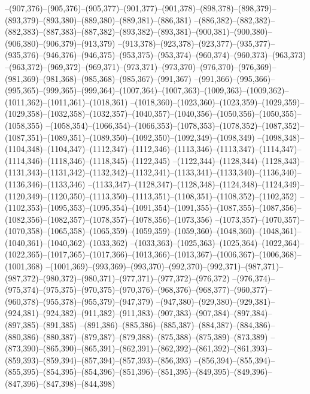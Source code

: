 --(907,376)--(905,376)--(905,377)--(901,377)--(901,378)--(898,378)--(898,379)--(893,379)--(893,380)--(889,380)--(889,381)--(886,381)
--(886,382)--(882,382)--(882,383)--(887,383)--(887,382)--(893,382)--(893,381)--(900,381)--(900,380)--(906,380)--(906,379)--(913,379)
--(913,378)--(923,378)--(923,377)--(935,377)--(935,376)--(946,376)--(946,375)--(953,375)--(953,374)--(960,374)--(960,373)--(963,373)
--(963,372)--(969,372)--(969,371)--(973,371)--(973,370)--(976,370)--(976,369)--(981,369)--(981,368)--(985,368)--(985,367)--(991,367)
--(991,366)--(995,366)--(995,365)--(999,365)--(999,364)--(1007,364)--(1007,363)--(1009,363)--(1009,362)--(1011,362)--(1011,361)--(1018,361)
--(1018,360)--(1023,360)--(1023,359)--(1029,359)--(1029,358)--(1032,358)--(1032,357)--(1040,357)--(1040,356)--(1050,356)--(1050,355)--(1058,355)
--(1058,354)--(1066,354)--(1066,353)--(1078,353)--(1078,352)--(1087,352)--(1087,351)--(1089,351)--(1089,350)--(1092,350)--(1092,349)--(1098,349)
--(1098,348)--(1104,348)--(1104,347)--(1112,347)--(1112,346)--(1113,346)--(1113,347)--(1114,347)--(1114,346)--(1118,346)--(1118,345)--(1122,345)
--(1122,344)--(1128,344)--(1128,343)--(1131,343)--(1131,342)--(1132,342)--(1132,341)--(1133,341)--(1133,340)--(1136,340)--(1136,346)--(1133,346)
--(1133,347)--(1128,347)--(1128,348)--(1124,348)--(1124,349)--(1120,349)--(1120,350)--(1113,350)--(1113,351)--(1108,351)--(1108,352)--(1102,352)
--(1102,353)--(1095,353)--(1095,354)--(1091,354)--(1091,355)--(1087,355)--(1087,356)--(1082,356)--(1082,357)--(1078,357)--(1078,356)--(1073,356)
--(1073,357)--(1070,357)--(1070,358)--(1065,358)--(1065,359)--(1059,359)--(1059,360)--(1048,360)--(1048,361)--(1040,361)--(1040,362)--(1033,362)
--(1033,363)--(1025,363)--(1025,364)--(1022,364)--(1022,365)--(1017,365)--(1017,366)--(1013,366)--(1013,367)--(1006,367)--(1006,368)--(1001,368)
--(1001,369)--(993,369)--(993,370)--(992,370)--(992,371)--(987,371)--(987,372)--(980,372)--(980,371)--(977,371)--(977,372)--(976,372)
--(976,374)--(975,374)--(975,375)--(970,375)--(970,376)--(968,376)--(968,377)--(960,377)--(960,378)--(955,378)--(955,379)--(947,379)
--(947,380)--(929,380)--(929,381)--(924,381)--(924,382)--(911,382)--(911,383)--(907,383)--(907,384)--(897,384)--(897,385)--(891,385)
--(891,386)--(885,386)--(885,387)--(884,387)--(884,386)--(880,386)--(880,387)--(879,387)--(879,388)--(875,388)--(875,389)--(873,389)
--(873,390)--(865,390)--(865,391)--(862,391)--(862,392)--(861,392)--(861,393)--(859,393)--(859,394)--(857,394)--(857,393)--(856,393)
--(856,394)--(855,394)--(855,395)--(854,395)--(854,396)--(851,396)--(851,395)--(849,395)--(849,396)--(847,396)--(847,398)--(844,398)
